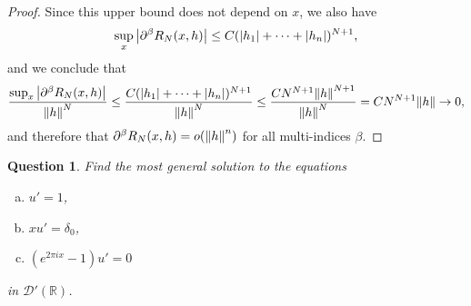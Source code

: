 \documentclass{article}
\theoremstyle{plain}
\newtheorem{question}{Question}
\theoremstyle{remark}
\newcommand{\Bb}{\mathbb}
\newcommand{\Cal}{\mathcal}
\newcommand{\RR}{\Bb R}
\newcommand{\DD}{\Cal D}
\newcommand\pt\partial
\begin{document}
\begin{proof}
Since this upper bound does not depend on $x$, we also have
\[
\sup_x \abs{\pt^\beta R_N(x, h)} \leq C(\abs{h_1} + \dotsb + \abs{h_n})^{N+1}, 
\]
and we conclude that
\[ 
\frac{\sup_x \abs{\pt^\beta R_N(x, h)}}{\norm{h}^N} \leq \frac{C(\abs{h_1} + \dotsb + \abs{h_n})^{N+1}}{\norm{h}^N} \leq \frac{C N^{N+1} \norm{h}^{N+1}}{\norm{h}^N} = CN^{N+1} \norm{h} \to 0, 
\]
and therefore that $\pt^\beta R_N(x, h) = o(\norm{h}^n)$ for all multi-indices $\beta$. 
\end{proof}


\setcounter{question}{7}
\begin{question}
	Find the most general solution to the equations
	\begin{enumerate}[(a)]
		\item $u'  = 1$,
		\item $xu' = \delta_0$,
		\item $(e^{2\pi i x} - 1)u' = 0$
	\end{enumerate}
	in $\DD'(\RR)$. 
\end{question}
\end{document}
